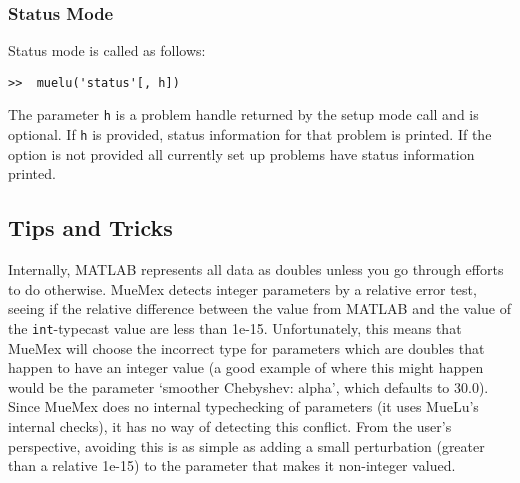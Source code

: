 \subsubsection{Status Mode}
Status mode is called as follows:
\begin{verbatim}
>>  muelu('status'[, h])
\end{verbatim}
The parameter \texttt{h} is a problem handle returned by the
setup mode call and is optional.  If \texttt{h} is provided, status
information for that problem is printed.  If the option is not provided all currently
set up problems have status information printed.

\subsection{Tips and Tricks }\label{sec:muemex:tips}

Internally, MATLAB represents all data as doubles unless you go
through efforts to do otherwise.  MueMex detects integer parameters by
a relative error test, seeing if the relative difference between the
value from MATLAB and the value of the \texttt{int}-typecast value are
less than 1e-15.  Unfortunately, this means that MueMex will choose the
incorrect type for parameters which are doubles that happen to have an
integer value (a good example of where this might happen would be the parameter
`smoother Chebyshev: alpha', which defaults to 30.0).  Since MueMex does no
internal typechecking of
parameters (it uses MueLu's internal checks), it has no way of detecting
this conflict.  From the user's perspective, avoiding this is as
simple as adding a small perturbation (greater than a relative 1e-15)
to the parameter that makes it non-integer valued.

